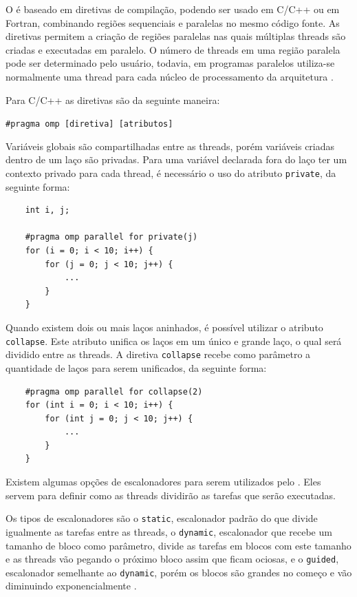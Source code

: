 O \openMP é baseado em diretivas de compilação, podendo ser usado em C/C++ ou em Fortran, combinando regiões sequenciais e paralelas no mesmo código fonte. As diretivas permitem a criação de regiões paralelas nas quais múltiplas threads são criadas e executadas em paralelo. O número de threads em uma região paralela pode ser determinado pelo usuário, todavia, em programas paralelos utiliza-se normalmente uma thread para cada núcleo de processamento da arquitetura \cite{Chapman2008}.

Para C/C++ as diretivas são da seguinte maneira:
\begin{center}
\texttt{\#pragma omp [diretiva] [atributos]}
\end{center}

Variáveis globais são compartilhadas entre as threads, porém variáveis criadas dentro de um laço são privadas. Para uma variável declarada fora do laço ter um contexto privado para cada thread, é necessário o uso do atributo \texttt{private}, da seguinte forma:
\begin{lstlisting}
    int i, j;
    
    #pragma omp parallel for private(j)
    for (i = 0; i < 10; i++) {
        for (j = 0; j < 10; j++) {
            ...
        }
    }
\end{lstlisting}

Quando existem dois ou mais laços aninhados, é possível utilizar o atributo \texttt{collapse}. Este atributo unifica os laços em um único e grande laço, o qual será dividido entre as threads. A diretiva \texttt{collapse} recebe como parâmetro a quantidade de laços para serem unificados, da seguinte forma:
\begin{lstlisting}
    #pragma omp parallel for collapse(2)
    for (int i = 0; i < 10; i++) {
        for (int j = 0; j < 10; j++) {
            ...
        }
    }
\end{lstlisting}

Existem algumas opções de escalonadores para serem utilizados pelo \openMP. Eles servem para definir como as threads dividirão as tarefas que serão executadas.

Os tipos de escalonadores são o \texttt{static}, escalonador padrão do \openMP que divide igualmente as tarefas entre as threads, o \texttt{dynamic}, escalonador que recebe um tamanho de bloco como parâmetro, divide as tarefas em blocos com este tamanho e as threads vão pegando o próximo bloco assim que ficam ociosas, e o \texttt{guided}, escalonador semelhante ao \texttt{dynamic}, porém os blocos são grandes no começo e vão diminuindo exponencialmente \cite{Chandra2000}.

